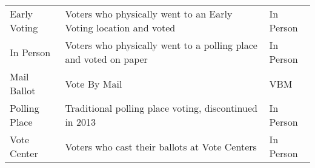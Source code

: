 \documentclass[12pt,twoside]{reedthesis}
\begin{document}
\begin{longtable}[]{@{}lll@{}}
\begin{minipage}[t]{0.22\columnwidth}
  Early Voting\strut
  \end{minipage} & \begin{minipage}[t]{0.42\columnwidth}\raggedright\strut
  Voters who physically went to an Early Voting location and voted\strut
  \end{minipage} & \begin{minipage}[t]{0.18\columnwidth}\raggedright\strut
  In Person\strut
  \end{minipage}\tabularnewline
  \begin{minipage}[t]{0.22\columnwidth}\raggedright\strut
  In Person\strut
  \end{minipage} & \begin{minipage}[t]{0.42\columnwidth}\raggedright\strut
  Voters who physically went to a polling place and voted on paper\strut
  \end{minipage} & \begin{minipage}[t]{0.18\columnwidth}\raggedright\strut
  In Person\strut
  \end{minipage}\tabularnewline
  \begin{minipage}[t]{0.22\columnwidth}\raggedright\strut
  Mail Ballot\strut
  \end{minipage} & \begin{minipage}[t]{0.42\columnwidth}\raggedright\strut
  Vote By Mail\strut
  \end{minipage} & \begin{minipage}[t]{0.18\columnwidth}\raggedright\strut
  VBM\strut
  \end{minipage}\tabularnewline
  \begin{minipage}[t]{0.22\columnwidth}\raggedright\strut
  Polling Place\strut
  \end{minipage} & \begin{minipage}[t]{0.42\columnwidth}\raggedright\strut
  Traditional polling place voting, discontinued in 2013\strut
  \end{minipage} & \begin{minipage}[t]{0.18\columnwidth}\raggedright\strut
  In Person\strut
  \end{minipage}\tabularnewline
  \begin{minipage}[t]{0.22\columnwidth}\raggedright\strut
  Vote Center\strut
  \end{minipage} & \begin{minipage}[t]{0.42\columnwidth}\raggedright\strut
  Voters who cast their ballots at Vote Centers\strut
  \end{minipage} & \begin{minipage}[t]{0.18\columnwidth}\raggedright\strut
  In Person\strut
  \end{minipage}\tabularnewline
  \bottomrule
  \end{longtable}
  
\end{document}
